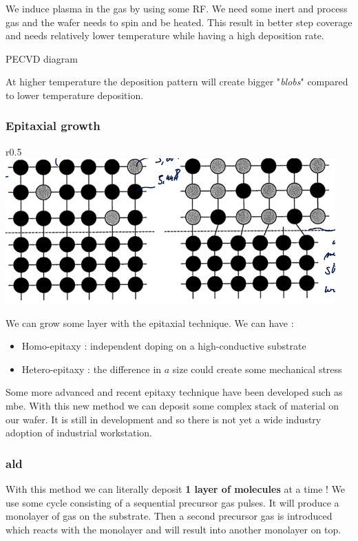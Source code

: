 \documentclass[
]{article}
\begin{document}
We induce plasma in the gas by using some RF. We need some inert and
process gas and the wafer needs to spin and be heated. This result in
better step coverage and needs relatively lower temperature while having
a high deposition rate.

PECVD diagram

At higher temperature the deposition pattern will create bigger
"\emph{blobs}" compared to lower temperature deposition.

\hypertarget{epitaxial-growth}{%
\subsubsection{Epitaxial growth}\label{epitaxial-growth}}

r0.5
\includegraphics[width=0.95\textwidth,height=\textheight]{mechanical_stress_epitaxy.png}

We can grow some layer with the epitaxial technique. We can have :

\begin{itemize}
\item
  Homo-epitaxy : independent doping on a high-conductive substrate
\item
  Hetero-epitaxy : the difference in \(a\) size could create some
  mechanical stress
\end{itemize}

Some more advanced and recent epitaxy technique have been developed such
as {mbe}. With this new method we can deposit some complex stack of
material on our wafer. It is still in development and so there is not
yet a wide industry adoption of industrial workstation.

\hypertarget{ald}{%
\subsubsection{\texorpdfstring{{ald}}{ald}}\label{ald}}

With this method we can literally deposit \textbf{1 layer of molecules}
at a time ! We use some cycle consisting of a sequential precursor gas
pulses. It will produce a monolayer of gas on the substrate. Then a
second precursor gas is introduced which reacts with the monolayer and
will result into another monolayer on top.
\end{document}
